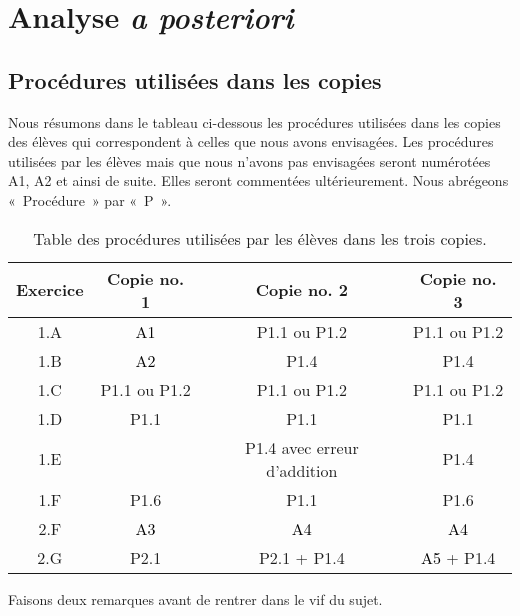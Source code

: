 \documentclass{report}
\theoremstyle{definition}
\begin{document}
\newpage

\section*{Analyse \textit{a posteriori}}

\subsection*{Procédures utilisées dans les copies}

Nous résumons dans le tableau ci-dessous les procédures utilisées dans les copies des élèves qui correspondent à celles que nous avons envisagées. Les procédures utilisées par les élèves mais que nous n'avons pas envisagées seront numérotées A1, A2 et ainsi de suite. Elles seront commentées ultérieurement. Nous abrégeons «~Procédure~» par «~P~».

\begin{table}[h]
\begin{center}
\begin{tabular}{|c|c|c|c|}
\hline 
Exercice & Copie no. 1 & Copie no. 2 & Copie no. 3 \\ \hline  \hline
1.A & \textcolor{black}{A1} & P1.1 ou P1.2 & P1.1 ou P1.2 \\ \hline
1.B & \textcolor{black}{A2} & P1.4 & P1.4 \\ \hline
1.C & P1.1 ou P1.2 & P1.1 ou P1.2 & P1.1 ou P1.2  \\ \hline
1.D & P1.1 & P1.1 & P1.1 \\ \hline
1.E &  & P1.4 avec erreur d'addition & P1.4 \\ \hline
1.F & P1.6 & P1.1 & P1.6 \\ \hline \hline
2.F & \textcolor{black}{A3} & \textcolor{black}{A4} & \textcolor{black}{A4} \\ \hline
2.G & P2.1 & P2.1 + P1.4 & \textcolor{black}{A5} + P1.4 \\ \hline
\end{tabular}
\caption{Table des procédures utilisées par les élèves dans les trois copies.}
\end{center}
\end{table}

Faisons deux remarques avant de rentrer dans le vif du sujet.
\end{document}
